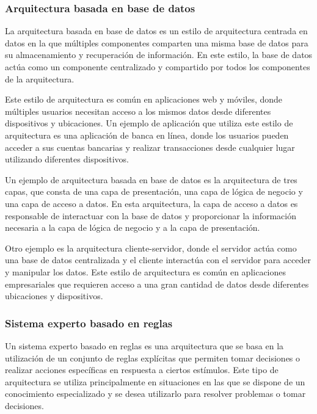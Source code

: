 \documentclass[executivepaper]{article}
\begin{document}
\subsubsection*{Arquitectura basada en base de datos}

La arquitectura basada en base de datos es un estilo de arquitectura centrada en datos en la que múltiples componentes comparten una misma base de datos para su almacenamiento y recuperación de información. En este estilo, la base de datos actúa como un componente centralizado y compartido por todos los componentes de la arquitectura.

Este estilo de arquitectura es común en aplicaciones web y móviles, donde múltiples usuarios necesitan acceso a los mismos datos desde diferentes dispositivos y ubicaciones. Un ejemplo de aplicación que utiliza este estilo de arquitectura es una aplicación de banca en línea, donde los usuarios pueden acceder a sus cuentas bancarias y realizar transacciones desde cualquier lugar utilizando diferentes dispositivos.

Un ejemplo de arquitectura basada en base de datos es la arquitectura de tres capas, que consta de una capa de presentación, una capa de lógica de negocio y una capa de acceso a datos. En esta arquitectura, la capa de acceso a datos es responsable de interactuar con la base de datos y proporcionar la información necesaria a la capa de lógica de negocio y a la capa de presentación.

Otro ejemplo es la arquitectura cliente-servidor, donde el servidor actúa como una base de datos centralizada y el cliente interactúa con el servidor para acceder y manipular los datos. Este estilo de arquitectura es común en aplicaciones empresariales que requieren acceso a una gran cantidad de datos desde diferentes ubicaciones y dispositivos.

\subsubsection*{Sistema experto basado en reglas}

Un sistema experto basado en reglas es una arquitectura que se basa en la utilización de un conjunto de reglas explícitas que permiten tomar decisiones o realizar acciones específicas en respuesta a ciertos estímulos. Este tipo de arquitectura se utiliza principalmente en situaciones en las que se dispone de un conocimiento especializado y se desea utilizarlo para resolver problemas o tomar decisiones.
\end{document}
